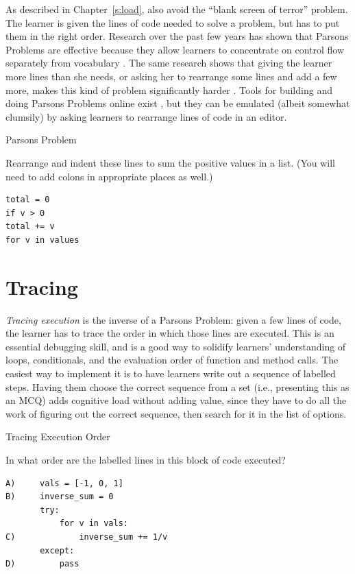 As described in Chapter~\ref{s:load},  also avoid the ``blank screen of terror''
problem. The learner is given the lines of code needed to solve a
problem, but has to put them in the right order. Research over the
past few years has shown that Parsons Problems are effective because
they allow learners to concentrate on control flow separately from
vocabulary
\cite{Pars2006,Eric2015,Morr2016,Eric2017}. The
same research shows that giving the learner more lines than she needs,
or asking her to rearrange some lines and add a few more, makes this
kind of problem significantly harder \cite{Harm2016}. Tools for
building and doing Parsons Problems online exist \cite{Ihan2011},
but they can be emulated (albeit somewhat clumsily) by asking learners
to rearrange lines of code in an editor.

\begin{aside}{Parsons Problem}

Rearrange and indent these lines to sum the positive values in a list.
(You will need to add colons in appropriate places as well.)

\begin{verbatim}
total = 0
if v > 0
total += v
for v in values
\end{verbatim}

\end{aside}

\section{Tracing}\label{s:exercises-tracing}

\emph{Tracing execution} is the inverse of a Parsons Problem: given a few
lines of code, the learner has to trace the order in which those lines
are executed. This is an essential debugging skill, and is a good way to
solidify learners' understanding of loops, conditionals, and the
evaluation order of function and method calls. The easiest way to
implement it is to have learners write out a sequence of labelled steps.
Having them choose the correct sequence from a set (i.e., presenting
this as an MCQ) adds cognitive load without adding value, since they
have to do all the work of figuring out the correct sequence, then
search for it in the list of options.

\begin{aside}{Tracing Execution Order}

In what order are the labelled lines in this block of code executed?

\begin{verbatim}
A)     vals = [-1, 0, 1]
B)     inverse_sum = 0
       try:
           for v in vals:
C)             inverse_sum += 1/v
       except:
D)         pass
\end{verbatim}

\end{aside}

